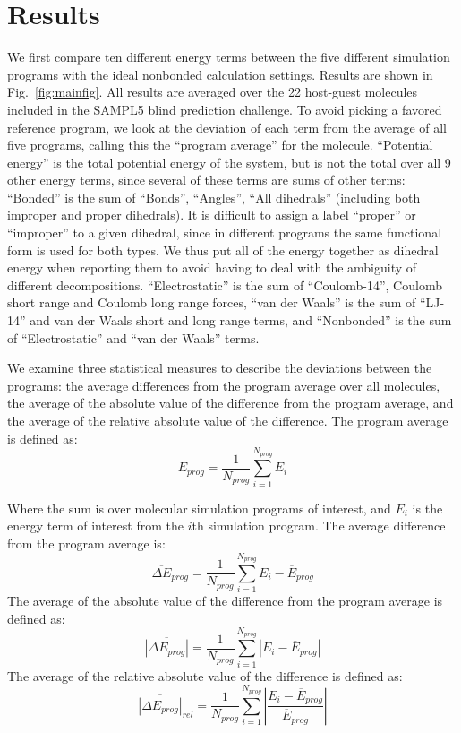\section*{Results}
We first compare ten different energy terms between the five different
simulation programs with the ideal nonbonded calculation settings.  Results are
shown in Fig.~\ref{fig:mainfig}. All results are averaged over the 22
host-guest molecules included in the SAMPL5 blind prediction
challenge. To avoid picking a favored reference program, we look at
the deviation of each term from the average of all five programs,
calling this the ``program average'' for the molecule.  ``Potential
energy'' is the total potential energy of the system, but is not the
total over all 9 other energy terms, since several of these terms are
sums of other terms: ``Bonded'' is the sum of ``Bonds'', ``Angles'',
``All dihedrals'' (including both improper and proper dihedrals). 
It is difficult to assign a label ``proper'' or ``improper'' to a
given dihedral, since in different programs the same functional form
is used for both types. We thus put all of the energy together as
dihedral energy when reporting them to avoid having to deal with the
ambiguity of different decompositions.
``Electrostatic'' is the sum of ``Coulomb-14'', Coulomb short range
and Coulomb long range forces, ``van der Waals'' is the sum of
``LJ-14'' and van der Waals short and long range terms, and
``Nonbonded'' is the sum of ``Electrostatic'' and ``van der Waals''
terms.

We examine three statistical measures to describe the deviations
between the programs: the average differences from the program average
over all molecules, the average of the absolute value of the
difference from the program average, and the average of the relative absolute value of the difference. 
The program average is defined as: 
\[  \overline{E}_{prog} = \frac{1}{N_{prog}}\sum_{i=1}^{N_{prog}} E_i \]

Where the sum is over molecular simulation programs of interest, and $E_i$ is the energy term of interest from the $i$th simulation program.  The average difference from the program average is: 
\[  \overline{\Delta E}_{prog} = \frac{1}{N_{prog}}\sum_{i=1}^{N_{prog}} E_i - \overline{E}_{prog} \]
The average of the absolute value of the difference from the program average is defined as:
\[  \overline{\left|\Delta E_{prog}\right|} = \frac{1}{N_{prog}}\sum_{i=1}^{N_{prog}} \left|E_i - \overline{E}_{prog}\right| \]
The average of the relative absolute value of the difference is defined as:
\[  \overline{\left|\Delta E_{prog}\right|}_{rel} = \frac{1}{N_{prog}}\sum_{i=1}^{N_{prog}} \left|\frac{E_i - \overline{E}_{prog}}{\overline{E}_{prog}}\right| \]

